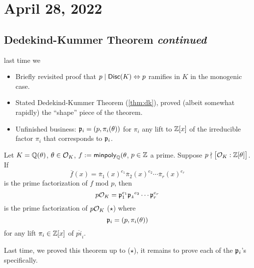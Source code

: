 \section{April 28, 2022}
\subsection{Dedekind-Kummer Theorem \emph{continued}}
\recall last time we
\begin{itemize}
    \item Briefly revisited proof that $p\mid \operatorname{\mathsf{Disc}}(K)\Leftrightarrow p$ ramifies in $K$ in the monogenic case.
    \item Stated Dedekind-Kummer Theorem (\cref{thm:dk}), proved (albeit somewhat rapidly) the ``shape'' piece of the theorem.
    \item Unfinished business: $\mathfrak{p}_i = (p, \pi_i(\theta))$ for $\pi_i$ any lift to $\mathbb Z[x]$ of the irreducible factor $\pi_i$ that corresponds to $\mathfrak{p}_i$.
\end{itemize}
\begin{theorem*}
    Let $K = \mathbb Q(\theta)$, $\theta \in \mathcal{O}_K$, $f := \operatorname{\mathsf{minpoly}}_\mathbb Q(\theta$, $p\in\mathbb Z$ a prime.
    Suppose $p\nmid \big[\mathcal{O}_K : \mathbb Z[\theta]\big]$. If
    \[\overline{f}(x) = \overline{\pi}_1(x)^{e_1}\overline{\pi}_2(x)^{e_2}\cdots \overline{\pi}_r(x)^{e_r}\]
    is the prime factorization of $f$ mod $p$, then
    \[p\mathcal{O}_K = \mathfrak{p}_1^{e_1}\mathfrak{p_2}^{e_2}\cdots \mathfrak{p}_r^{e_r}\]
    is the prime factorization of $p\mathcal{O}_K$ ($\star$) where
    \[\mathfrak{p}_i = (p, \pi_i(\theta))\]
    for any lift $\pi_i\in\mathbb Z[x]$ of $\overline{pi}_i$.
\end{theorem*}
Last time, we proved this theorem up to ($\star$), it remains to prove each of the $\mathfrak{p}_i$'s specifically.
